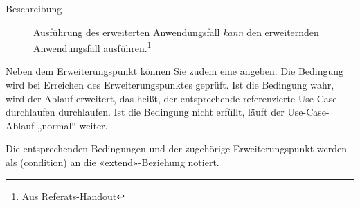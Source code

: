 \documentclass{lehramt-informatik-haupt}
\begin{document}
\begin{description}
\begin{description}
\item[Beschreibung]

Ausführung des erweiterten Anwendungsfall \emph{kann} den erweiternden
Anwendungsfall ausführen.\footnote{Aus Referats-Handout}
\end{description}


Neben dem Erweiterungspunkt können Sie zudem eine  angeben. Die Bedingung wird bei Erreichen des
Erweiterungspunktes geprüft. Ist die Bedingung wahr, wird der
Ablauf erweitert, das heißt, der entsprechende referenzierte Use-Case
durchlaufen durchlaufen. Ist die Bedingung nicht erfüllt, läuft der
Use-Case-Ablauf „normal“ weiter.

Die entsprechenden Bedingungen und der zugehörige Erweiterungspunkt
werden als  (condition) an die «extend»-Beziehung
notiert.

\begin{center}
\end{center}

\end{description}

\literatur
\end{document}
